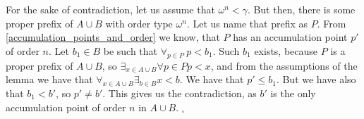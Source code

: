 For the sake of contradiction, let us assume that $\omega^n < \gamma$. But then, 
there is some proper prefix of $A\cup B$ with order type $\omega^n$. Let us name that 
prefix as $P$. From \ref{accumulation_points_and_order} we know, that 
$P$ has an accumulation point $p'$ of order $n$. 
Let $b_1 \in B$ be such that $\forall_{p \in P}\ p<b_1$. Such $b_1$ exists, because $P$ is 
a proper prefix of $A\cup B$, so $\exists_{x\in A\cup B}\forall{p\in P} p < x$, and 
from the assumptions of the lemma we have that 
$\forall_{x \in A\cup B}\exists_{b \in B} x < b$.
We have that $p' \leq b_1$. But we have also that $b_1 < b'$, so $p' \neq b'$. This gives us the 
contradiction, as $b'$ is the only accumulation point of order $n$ in $A\cup B$. $_\square$






